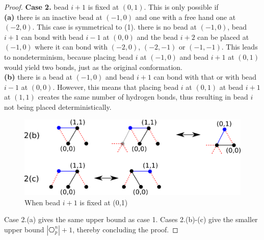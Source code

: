 \begin{proof}
\noindent\textbf{Case 2.} bead $i+1$ is fixed at $(0,1)$. This is only possible if\\
\textbf{(a)} there is an inactive bead at $(-1,0)$ and one with a free hand one at $(-2,0)$. This case is symmetrical to (1).
there is no bead at $(-1,0)$, bead $i+1$ can bond with bead $i-1$ at $(0,0)$ and the bead $i+2$ can be placed at $(-1,0)$ where it can bond with $(-2,0)$, $(-2,-1)$ or $(-1,-1)$. This leads to nondeterminism, because placing bead $i$ at $(-1,0)$ and bead $i+1$ at $(0,1)$ would yield two bonds, just as the original conformation.\\
\textbf{(b)	} there is a bead at $(-1,0)$ and bead $i+1$ can bond with that or with bead $i-1$ at $(0,0)$. However, this means that placing bead $i$ at $(0,1)$ at bead $i+1$ at $(1,1)$ creates the same number of hydrogen bonds, thus resulting in bead $i$ not being placed deterministically.
		




\begin{figure}
	\centering
	\includegraphics[width=0.8\linewidth]{./Fig/hexagonOut3n}
	
	\caption{When bead $i+1$ is fixed at (0,1)}
	\label{fig:hexagonOut3}
\end{figure}

Case 2.(a) gives the same upper bound as case 1. Cases 2.(b)-(c) give the smaller upper bound $|\hexagon_p^n|+1$, thereby concluding the proof.
\end{proof}


